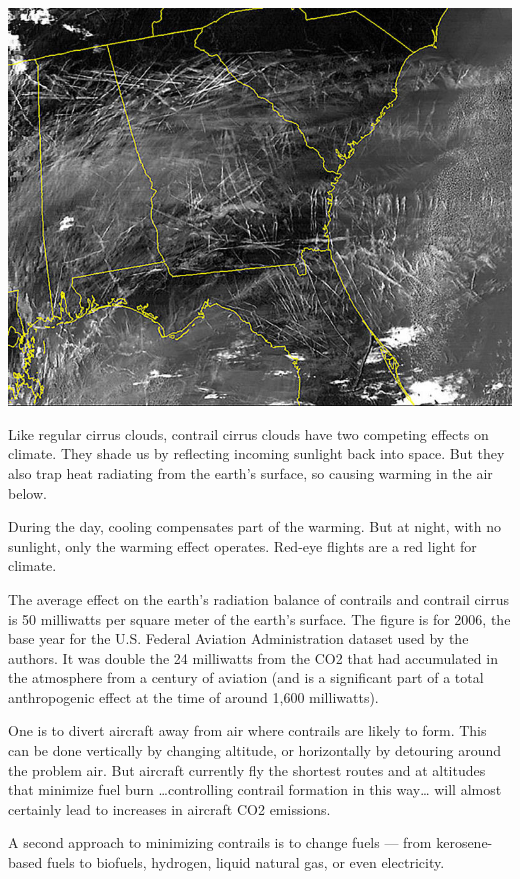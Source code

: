 \documentclass[
]{book}
\begin{document}
\includegraphics{fig/contrails.jpg}

Like regular cirrus clouds, contrail cirrus clouds have two competing effects on climate. They shade us by reflecting incoming sunlight back into space. But they also trap heat radiating from the earth's surface, so causing warming in the air below.

During the day, cooling compensates part of the warming. But at night, with no sunlight, only the warming effect operates. Red-eye flights are a red light for climate.

The average effect on the earth's radiation balance of contrails and contrail cirrus is 50 milliwatts per square meter of the earth's surface.
The figure is for 2006, the base year for the U.S. Federal Aviation Administration dataset used by the authors. It was double the 24 milliwatts from the CO2 that had accumulated in the atmosphere from a century of aviation (and is a significant part of a total anthropogenic effect at the time of around 1,600 milliwatts).

One is to divert aircraft away from air where contrails are likely to form. This can be done vertically by changing altitude, or horizontally by detouring around the problem air. But aircraft currently fly the shortest routes and at altitudes that minimize fuel burn \ldots controlling contrail formation in this way\ldots{} will almost certainly lead to increases in aircraft CO2 emissions.

A second approach to minimizing contrails is to change fuels --- from kerosene-based fuels to biofuels, hydrogen, liquid natural gas, or even electricity.
\end{document}
